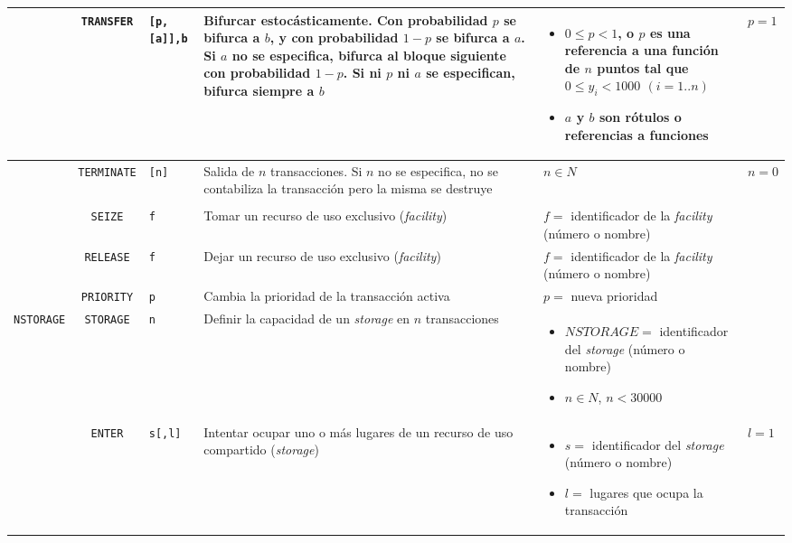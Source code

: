 \documentclass{article}
\providecommand{\tabularnewline}{\\}
\begin{document}
\begin{longtable}{|lc>{\raggedright}p{}|>{\raggedright}p{}|>{\raggedright}p{}|>{\raggedright}p{}|}
\hline
& \texttt{TRANSFER} & \texttt{[p,[a]],b} &
Bifurcar estocásticamente. Con probabilidad $p$ se bifurca a $b$,
y con probabilidad \textbf{$1-p$} se bifurca a $a$.
Si $a$ no se especifica, bifurca al bloque siguiente con probabilidad $1-p$.
Si ni $p$ ni $a$ se especifican, bifurca siempre a $b$ &
\begin{itemize}
  \item $0\leq p<1$, o $p$ es una referencia a una función de $n$ puntos tal que $0 \leq y_{i} < 1000$ $(i=1..n)$
  \item $a$ y \textbf{$b$} son rótulos o referencias a funciones
\end{itemize} &
$p=1$ \tabularnewline

\hline
& \texttt{TERMINATE} & \texttt{[n]} &
Salida de $n$ transacciones. Si $n$ no se especifica, no se contabiliza la transacción pero la misma se destruye &
$n \in N$ & $n=0$ \tabularnewline

\hline
\pagebreak

\hline
\multicolumn{6}{c}{\textbf{Facilities, colas, storages y prioridades}} \tabularnewline

\hline
& \texttt{SEIZE} & \texttt{f} &
Tomar un recurso de uso exclusivo (\emph{facility}) &
$f=$ identificador de la \emph{facility} (número o nombre) & \tabularnewline

\hline
& \texttt{RELEASE} & \texttt{f} &
Dejar un recurso de uso exclusivo (\emph{facility}) &
$f=$ identificador de la \emph{facility} (número o nombre) & \tabularnewline

\hline
& \texttt{PRIORITY} & \texttt{p} &
Cambia la prioridad de la transacción activa & $p=$ nueva prioridad & \tabularnewline

\hline
\texttt{NSTORAGE} & \texttt{STORAGE} & \texttt{n} &
Definir la capacidad de un \emph{storage} en $n$ transacciones &
\begin{itemize}
  \item $NSTORAGE=$ identificador del \emph{storage} (número o nombre)
  \item $n \in N$, $n < 30000$
\end{itemize} & \tabularnewline

\hline
& \texttt{ENTER} & \texttt{s[,l]} &
Intentar ocupar uno o más lugares de un recurso de uso compartido (\emph{storage}) &
\begin{itemize}
  \item $s=$ identificador del \emph{storage} (número o nombre)
  \item $l=$ lugares que ocupa la transacción
\end{itemize} &
$l=1$ \tabularnewline


\end{longtable}
\end{document}
